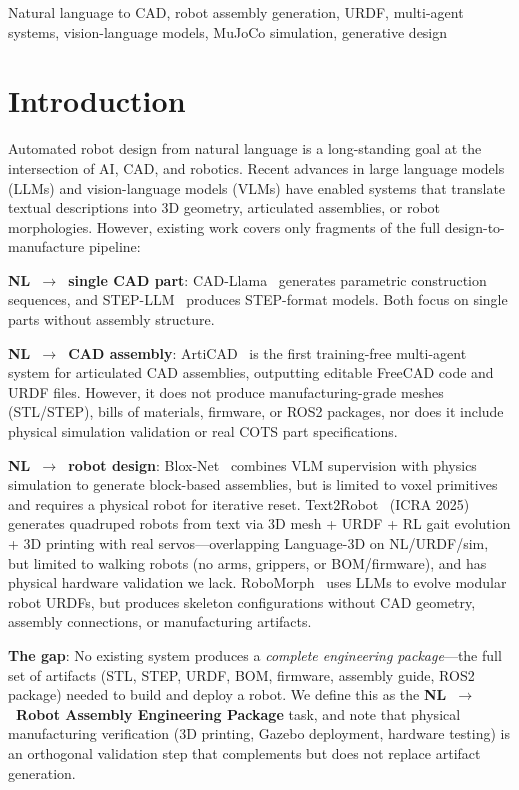 \documentclass[conference]{IEEEtran}
\begin{document}
\begin{IEEEkeywords}
Natural language to CAD, robot assembly generation, URDF, multi-agent systems, vision-language models, MuJoCo simulation, generative design
\end{IEEEkeywords}

\section{Introduction}
\label{sec:intro}

Automated robot design from natural language is a long-standing goal at the intersection of AI, CAD, and robotics. Recent advances in large language models (LLMs) and vision-language models (VLMs) have enabled systems that translate textual descriptions into 3D geometry, articulated assemblies, or robot morphologies. However, existing work covers only fragments of the full design-to-manufacture pipeline:

\textbf{NL~$\to$~single CAD part}: CAD-Llama~\cite{cadllama2025} generates parametric construction sequences, and STEP-LLM~\cite{stepllm2026} produces STEP-format models. Both focus on single parts without assembly structure.

\textbf{NL~$\to$~CAD assembly}: ArtiCAD~\cite{articad2026} is the first training-free multi-agent system for articulated CAD assemblies, outputting editable FreeCAD code and URDF files. However, it does not produce manufacturing-grade meshes (STL/STEP), bills of materials, firmware, or ROS2 packages, nor does it include physical simulation validation or real COTS part specifications.

\textbf{NL~$\to$~robot design}: Blox-Net~\cite{bloxnet2025} combines VLM supervision with physics simulation to generate block-based assemblies, but is limited to voxel primitives and requires a physical robot for iterative reset. Text2Robot~\cite{text2robot2025} (ICRA 2025) generates quadruped robots from text via 3D mesh + URDF + RL gait evolution + 3D printing with real servos---overlapping Language-3D on NL/URDF/sim, but limited to walking robots (no arms, grippers, or BOM/firmware), and has physical hardware validation we lack. RoboMorph~\cite{robomorph2024} uses LLMs to evolve modular robot URDFs, but produces skeleton configurations without CAD geometry, assembly connections, or manufacturing artifacts.

\textbf{The gap}: No existing system produces a \emph{complete engineering package}---the full set of artifacts (STL, STEP, URDF, BOM, firmware, assembly guide, ROS2 package) needed to build and deploy a robot. We define this as the \textbf{NL~$\to$~Robot Assembly Engineering Package} task, and note that physical manufacturing verification (3D printing, Gazebo deployment, hardware testing) is an orthogonal validation step that complements but does not replace artifact generation.
\end{document}
